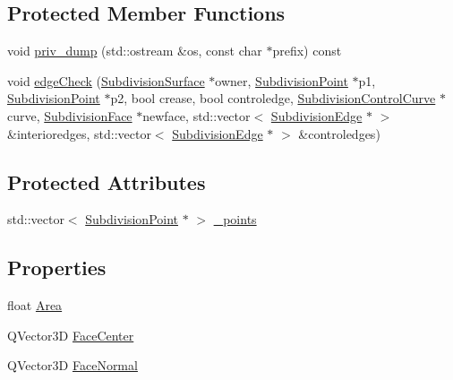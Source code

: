 \subsection*{Protected Member Functions}
\begin{DoxyCompactItemize}
\item 
void \hyperlink{classShipCADGeometry_1_1SubdivisionFace_ab2f647963b552728f40d8c329318676e}{priv\-\_\-dump} (std\-::ostream \&os, const char $\ast$prefix) const 
\item 
void \hyperlink{classShipCADGeometry_1_1SubdivisionFace_ae4a4aa76685437969018d50f912fa410}{edge\-Check} (\hyperlink{classShipCADGeometry_1_1SubdivisionSurface}{Subdivision\-Surface} $\ast$owner, \hyperlink{classShipCADGeometry_1_1SubdivisionPoint}{Subdivision\-Point} $\ast$p1, \hyperlink{classShipCADGeometry_1_1SubdivisionPoint}{Subdivision\-Point} $\ast$p2, bool crease, bool controledge, \hyperlink{classShipCADGeometry_1_1SubdivisionControlCurve}{Subdivision\-Control\-Curve} $\ast$curve, \hyperlink{classShipCADGeometry_1_1SubdivisionFace}{Subdivision\-Face} $\ast$newface, std\-::vector$<$ \hyperlink{classShipCADGeometry_1_1SubdivisionEdge}{Subdivision\-Edge} $\ast$ $>$ \&interioredges, std\-::vector$<$ \hyperlink{classShipCADGeometry_1_1SubdivisionEdge}{Subdivision\-Edge} $\ast$ $>$ \&controledges)
\end{DoxyCompactItemize}
\subsection*{Protected Attributes}
\begin{DoxyCompactItemize}
\item 
std\-::vector$<$ \hyperlink{classShipCADGeometry_1_1SubdivisionPoint}{Subdivision\-Point} $\ast$ $>$ \hyperlink{classShipCADGeometry_1_1SubdivisionFace_a1442d01623618d3bd3d231ac2f61bdf2}{\-\_\-points}
\end{DoxyCompactItemize}
\subsection*{Properties}
\begin{DoxyCompactItemize}
\item 
float \hyperlink{classShipCADGeometry_1_1SubdivisionFace_a19d38604a7e9f14c927c59616bb3b8a5}{Area}
\item 
Q\-Vector3\-D \hyperlink{classShipCADGeometry_1_1SubdivisionFace_a4ceab979e8faacf6c8c10420fb720080}{Face\-Center}
\item 
Q\-Vector3\-D \hyperlink{classShipCADGeometry_1_1SubdivisionFace_a4d9b9545d88ed7c470eadd42172c7530}{Face\-Normal}
\end{DoxyCompactItemize}



